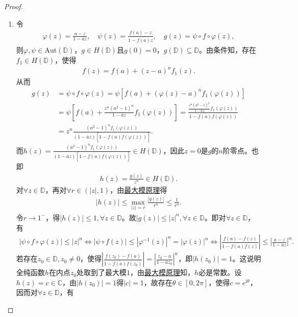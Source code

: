 \documentclass[../../main.tex]{subfiles}%
\begin{document}
\begin{proof}
\begin{enumerate}[(1)]
\item 令
\begin{align*}
\varphi(z)=\frac{a-z}{1-\overline{a}z},\quad \psi(z)=\frac{f(a)-z}{1-\overline{f(a)}z},\quad g(z)=\psi\circ f\circ \varphi(z),
\end{align*}
则$\varphi,\psi\in\mathrm{Aut}(\mathbb{D})$，$g\in H(\mathbb{D})$且$g(0)=0$，$g(\mathbb{D})\subseteq\mathbb{D}$。由条件知，存在$f_1\in H(\mathbb{D})$，使得
\begin{align*}
f(z)=f(a)+(z-a)^n f_1(z).
\end{align*}
从而
\begin{align*}
g(z)&=\psi\circ f\circ \varphi(z)=\psi\left[f(a)+\left(\varphi(z)-a\right)^n f_1\left(\varphi(z)\right)\right]\\
&=\psi\left[f(a)+\frac{z^n(a^2-1)^n}{1-\overline{a}z}f_1\left(\varphi(z)\right)\right]=\frac{\frac{z^n(a^2-1)^n}{1-\overline{a}z}f_1\left(\varphi(z)\right)}{1-\overline{f(a)}f\left(\varphi(z)\right)}\\
&=z^n\frac{(a^2-1)^n f_1\left(\varphi(z)\right)}{(1-\overline{a}z)\left[1-\overline{f(a)}f\left(\varphi(z)\right)\right]}.
\end{align*}
而$h(z)=\frac{(a^2-1)^n f_1\left(\varphi(z)\right)}{(1-\overline{a}z)\left[1-\overline{f(a)}f\left(\varphi(z)\right)\right]}\in H(\mathbb{D})$，因此$z=0$是$g$的$n$阶零点。也即
\begin{align*}
h(z)=\frac{g(z)}{z^n}\in H(\mathbb{D}).
\end{align*}
对$\forall z\in\mathbb{D}$，再对$\forall r\in(|z|,1)$，由\hyperref[theorem:最大模原理-定理4.5.1]{最大模原理}得
\begin{align*}
|h(z)|\leqslant\max\limits_{|z|=r}\frac{|g(z)|}{r^n}\leqslant\frac{1}{r^n}.
\end{align*}
令$r\rightarrow 1^-$，得$|h(z)|\leqslant 1,\forall z\in\mathbb{D}$。故$|g(z)|\leqslant |z|^n,\forall z\in\mathbb{D}$。即对$\forall z\in\mathbb{D}$，有
\begin{align*}
|\psi\circ f\circ \varphi(z)|\leqslant |z|^n\Longleftrightarrow |\psi\circ f(z)|\leqslant |\varphi^{-1}(z)|^n=|\varphi(z)|^n\Longleftrightarrow \left|\frac{f(a)-f(z)}{1-\overline{f(a)}f(z)}\right|\leqslant \left|\frac{a-z}{1-\overline{a}z}\right|^n.
\end{align*}
若存在$z_0\in\mathbb{D},z_0\neq 0$，使得$\left|\frac{f(z_0)-f(a)}{1-\overline{f(a)}f(z_0)}\right|=\left|\frac{z_0-a}{1-\overline{a}z_0}\right|^n$，即$|h(z_0)|=1$。这说明全纯函数$h$在内点$z_0$处取到了最大模$1$，由\hyperref[theorem:最大模原理-定理4.5.1]{最大模原理}知，$h$必是常数。设$h(z)=c\in\mathbb{C}$，由$|h(z_0)|=1$得$|c|=1$，故存在$\theta\in[0,2\pi]$，使得$c=e^{\mathrm{i}\theta}$，因而对$\forall z\in\mathbb{D}$，有

\end{enumerate}
\end{proof}
\end{document}

